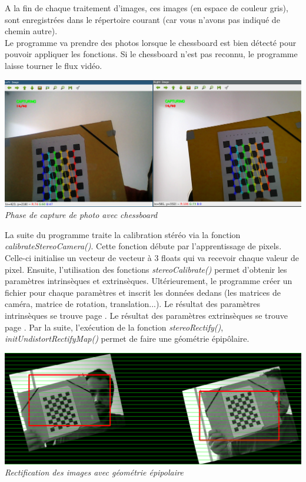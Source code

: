 \documentclass[12pt, french]{report}
\begin{document}
A la fin de chaque traitement d'images, ces images (en espace de couleur gris), sont enregistrées dans le répertoire courant (car vous n'avons pas indiqué de chemin autre).\\

Le programme va prendre des photos lorsque le chessboard est bien détecté pour pouvoir appliquer les fonctions. Si le chessboard n'est pas reconnu, le programme laisse tourner le flux vidéo.\\

\begin{center}
    \includegraphics[width=\textwidth]{Images/Code/PhaseCapt.png}\\
    \textit{Phase de capture de photo avec chessboard}
\end{center}

La suite du programme traite la calibration stéréo via la fonction \textit{calibrateStereoCamera()}. Cette fonction débute par l'apprentissage de pixels. Celle-ci initialise un vecteur de vecteur à 3 floats qui va recevoir chaque valeur de pixel. \newline
Ensuite, l'utilisation des fonctions \textit{stereoCalibrate()} permet d'obtenir les paramètres intrinsèques et extrinsèques. Ultérieurement, le programme créer un fichier pour chaque paramètres et inscrit les données dedans (les matrices de caméra, matrice de rotation, translation...).
Le résultat des paramètres intrinsèques se trouve page \pageref{Intrinsèques.yml}. Le résultat des paramètres extrinsèques se trouve page \pageref{Extrinsèques.yml}. \newline
Par la suite, l'exécution de la fonction \textit{stereoRectify()}, \textit{initUndistortRectifyMap()}  permet de faire une géométrie épipôlaire.

\begin{center}
    \includegraphics[width=\textwidth]{Images/epipol.png}\\
    \textit{Rectification des images avec géométrie épipolaire}\\
    \end{center}
    
\end{document}
